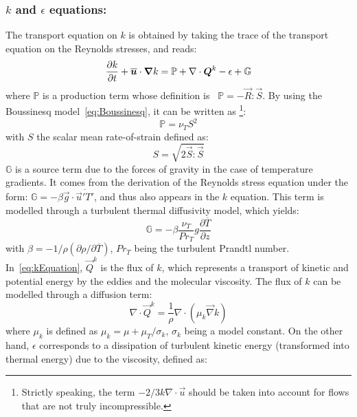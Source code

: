 \subsubsection{$k$ and $\epsilon$ equations:}\label{sec:kepsequations}

The transport equation on $k$ is obtained by taking the trace of the transport equation on the Reynolds stresses, and reads:
\begin{equation}\label{eq:kEquation}
  \dfrac{\partial k}{\partial t} +\overline{\bm{u}}\cdot \bm{\nabla} k= \mathbb P + \nabla \cdot \bm{Q}^k - \epsilon + \mathbb{G}
\end{equation}
where $\mathbb P$ is a production term whose definition is ~\mbox{$\mathbb P=-\vec{R}\!:\!\vec{S}$}.
By using the Boussinesq model~\eqref{eq:Boussinesq}, it can be written as%
\footnote{Strictly speaking, the term $-2/3 k \nabla \cdot \vec u$ should be taken into account for flows that are not truly incompressible.}:
\begin{equation}\label{eq:production}
  \mathbb P = \nu_T S^2
\end{equation}
with $S$ the scalar mean rate-of-strain defined as:
\begin{equation}\label{eq:scalarS}
  S = \sqrt{2\vec{S}:\vec{S}}
\end{equation}
$\mathbb{G}$ is a source term due to the forces of gravity in the case of temperature gradients.
It comes from the derivation of the Reynolds stress equation under the form: $\mathbb G = -\beta\vec{g}\cdot \overline{\vec{u}'T'}$, and thus also appears in the $k$ equation. This term is modelled through a turbulent thermal diffusivity model,
which yields:
\begin{equation}
\mathbb{G}=-\beta\dfrac{\nu_T}{Pr_T}g\dfrac{\partial \overline{T}}{\partial z}%
\end{equation}
with $\beta=-1/\rho(\partial\rho/\partial \overline{T})$, $Pr_T$ being the turbulent
Prandtl number.%
In~\eqref{eq:kEquation}, $\vec{Q}^k$ is the flux of $k$, which represents a transport of
kinetic and potential energy by the eddies and the molecular viscosity.
The flux of $k$ can be modelled through a diffusion term:
\begin{equation}
  \nabla \cdot \vec{Q}^k = \dfrac{1}{\rho}\nabla \cdot \left(\mu_k \vec \nabla k\right)
\end{equation}
where $\mu_k$ is defined as $\mu_k = \mu+\mu_T/\sigma_k$, $\sigma_k$ being a model constant.
On the other hand, $\epsilon$ corresponds to a dissipation of turbulent kinetic energy (transformed into thermal energy) due to the viscosity, defined as:
